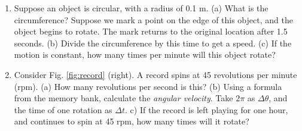 \documentclass{article}
\begin{document}
\begin{enumerate}
\item Suppose an object is circular, with a radius of 0.1 m. (a) What is the circumference?  Suppose we mark a point on the edge of this object, and the object begins to rotate.  The mark returns to the original location after 1.5 seconds.  (b) Divide the circumference by this time to get a speed.  (c)  If the motion is constant, how many times per minute will this object rotate? \\ \vspace{1cm}
\item Consider Fig. \ref{fig:record} (right).  A record spins at 45 revolutions per minute (rpm).  (a) How many revolutions per second is this? (b) Using a formula from the memory bank, calculate the \textit{angular velocity}.  Take $2\pi$ as $\Delta \theta$, and the time of one rotation as $\Delta t$.  c) If the record is left playing for one hour, and continues to spin at 45 rpm, how many times will it rotate?
\end{enumerate}
\end{document}

